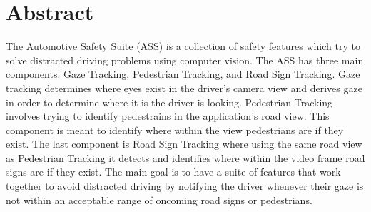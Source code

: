 \section*{Abstract}

The Automotive Safety Suite (ASS) is a collection of safety features which try to solve distracted driving problems using computer vision. The ASS has three main components: Gaze Tracking, Pedestrian Tracking, and Road Sign Tracking. Gaze tracking determines where eyes exist in the driver's camera view and derives gaze in order to determine where it is the driver is looking. Pedestrian Tracking involves trying to identify pedestrains in the application's road view. This component is meant to identify where within the view pedestrians are if they exist. The last component is Road Sign Tracking where using the same road view as Pedestrian Tracking it detects and identifies where within the video frame road signs are if they exist. The main goal is to have a suite of features that work together to avoid distracted driving by notifying the driver whenever their gaze is not within an acceptable range of oncoming road signs or pedestrians.